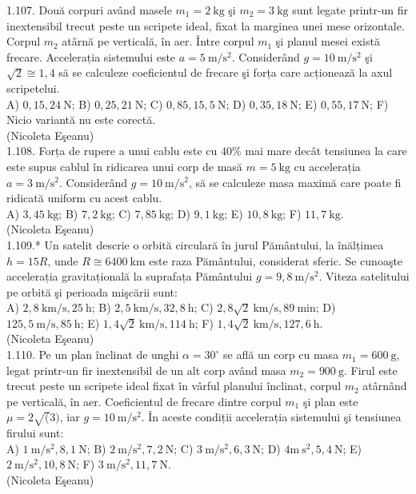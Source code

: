 1.107. Două corpuri având masele $m_{1}=2 \mathrm{~kg}$ şi $m_{2}=3 \mathrm{~kg}$ sunt legate printr-un fir inextensibil trecut peste un scripete ideal, fixat la marginea unei mese orizontale. Corpul $m_{2}$ atârnă pe verticală, în aer. Între corpul $m_{1}$ şi planul mesei există frecare. Accelerația sistemului este $a=5 \mathrm{~m} / \mathrm{s}^{2}$. Considerând $g=10 \mathrm{~m} / \mathrm{s}^{2}$ şi $\sqrt{2} \cong 1,4$ să se calculeze coeficientul de frecare şi forța care acționează la axul scripetelui.\\ A) $0,15, 24 \mathrm{~N}$; B) $0,25, 21 \mathrm{~N}$; C) $0,85, 15,5 \mathrm{~N}$; D) $0,35, 18 \mathrm{~N}$; E) $0,55, 17 \mathrm{~N}$; F) Nicio variantă nu este corectă.\\ (Nicoleta Eşeanu)\\

1.108. Forța de rupere a unui cablu este cu $40 \%$ mai mare decât tensiunea la care este supus cablul în ridicarea unui corp de masă $m=5 \mathrm{~kg}$ cu accelerația $a=3 \mathrm{~m} / \mathrm{s}^{2}$. Considerând $g=10 \mathrm{~m} / \mathrm{s}^{2}$, să se calculeze masa maximă care poate fi ridicată uniform cu acest cablu.\\ A) $3,45 \mathrm{~kg}$; B) $7,2 \mathrm{~kg}$; C) $7,85 \mathrm{~kg}$; D) $9,1 \mathrm{~kg}$; E) $10,8 \mathrm{~kg}$; F) $11,7 \mathrm{~kg}$.\\ (Nicoleta Eşeanu)\\

1.109.* Un satelit descrie o orbită circulară în jurul Pământului, la înălțimea $h=15 R$, unde $R \cong 6400 \mathrm{~km}$ este raza Pământului, considerat sferic. Se cunoaşte accelerația gravitațională la suprafața Pământului $g=9,8 \mathrm{~m} / \mathrm{s}^{2}$. Viteza satelitului pe orbită şi perioada mişcării sunt:\\ A) $2,8 \mathrm{~km} / \mathrm{s}, 25 \mathrm{~h}$; B) $2,5 \mathrm{~km} / \mathrm{s}, 32,8 \mathrm{~h}$; C) $2,8 \sqrt{2} \mathrm{~km} / \mathrm{s}, 89 \mathrm{~min}$; D) $125,5 \mathrm{~m} / \mathrm{s}, 85 \mathrm{~h}$; E) $1,4 \sqrt{2} \mathrm{~km} / \mathrm{s}, 114 \mathrm{~h}$; F) $1,4 \sqrt{2} \mathrm{~km} / \mathrm{s}, 127,6 \mathrm{~h}$.\\ (Nicoleta Eşeanu)\\

1.110. Pe un plan înclinat de unghi $\alpha=30^{\circ}$ se află un corp cu masa $m_{1}=600 \mathrm{~g}$, legat printr-un fir inextensibil de un alt corp având masa $m_{2}=900 \mathrm{~g}$. Firul este trecut peste un scripete ideal fixat în vârful planului înclinat, corpul $m_{2}$ atârnând pe verticală, în aer. Coeficientul de frecare dintre corpul $m_{1}$ şi plan este $\mu=2 \sqrt(3)$, iar $g=10 \mathrm{~m} / \mathrm{s}^{2}$. În aceste condiții accelerația sistemului şi tensiunea firului sunt:\\ A) $1 \mathrm{~m} / \mathrm{s}^{2}, 8,1 \mathrm{~N}$; B) $2 \mathrm{~m} / \mathrm{s}^{2}, 7,2 \mathrm{~N}$; C) $3 \mathrm{~m} / \mathrm{s}^{2}, 6,3 \mathrm{~N}$; D) $4 \mathrm{m} \mathrm{~s}^{2}, 5,4 \mathrm{~N}$; E) $2 \mathrm{~m} / \mathrm{s}^{2}, 10,8 \mathrm{~N}$; F) $3 \mathrm{~m} / \mathrm{s}^{2}, 11,7 \mathrm{~N}$. \\ (Nicoleta Eşeanu)\\


